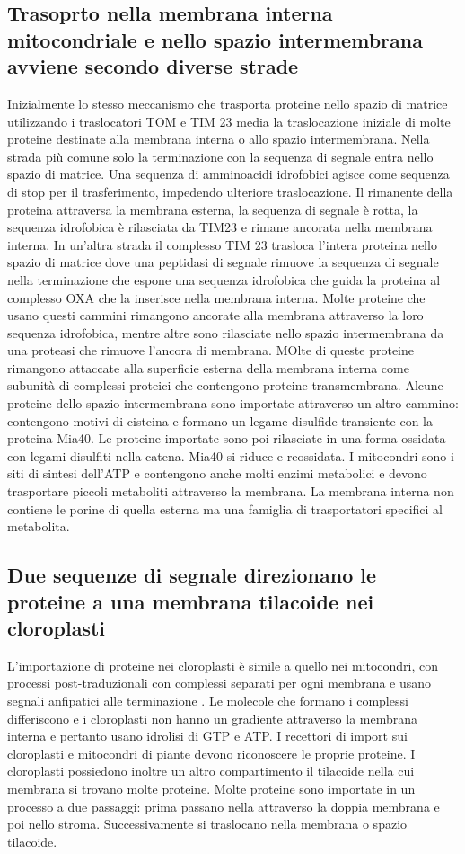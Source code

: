 \subsection{Trasoprto nella membrana interna mitocondriale e nello spazio intermembrana avviene secondo diverse strade}
Inizialmente lo stesso meccanismo che trasporta proteine nello spazio di matrice utilizzando i traslocatori TOM e TIM 23 media la traslocazione iniziale di molte proteine destinate
alla membrana interna o allo spazio intermembrana. Nella strada pi\`u comune solo la terminazione  con la sequenza di segnale entra nello spazio di matrice. Una sequenza di
amminoacidi idrofobici agisce come sequenza di stop per il trasferimento, impedendo ulteriore traslocazione. Il rimanente della proteina attraversa la membrana esterna, la sequenza
di segnale \`e rotta, la sequenza idrofobica \`e rilasciata da TIM23 e rimane ancorata nella membrana interna. In un'altra strada il complesso TIM 23 trasloca l'intera proteina nello
spazio di matrice dove una peptidasi di segnale rimuove la sequenza di segnale nella terminazione  che espone una sequenza idrofobica che guida la proteina al complesso OXA che
la inserisce nella membrana interna. Molte proteine che usano questi cammini rimangono ancorate alla membrana attraverso la loro sequenza idrofobica, mentre altre sono rilasciate 
nello spazio intermembrana da una proteasi che rimuove l'ancora di membrana. MOlte di queste proteine rimangono attaccate alla superficie esterna della membrana interna come subunit\`a
di complessi proteici che contengono proteine transmembrana. Alcune proteine dello spazio intermembrana sono importate attraverso un altro cammino: contengono motivi di cisteina e 
formano un legame disulfide transiente con la proteina Mia40. Le proteine importate sono poi rilasciate in una forma ossidata con legami disulfiti nella catena. Mia40 si riduce e 
reossidata. I mitocondri sono i siti di sintesi dell'ATP e contengono anche molti enzimi metabolici e devono trasportare piccoli metaboliti attraverso la membrana. La membrana interna
non contiene le porine di quella esterna ma una famiglia di trasportatori specifici al metabolita. 
\subsection{Due sequenze di segnale direzionano le proteine a una membrana tilacoide nei cloroplasti}
L'importazione di proteine nei cloroplasti \`e simile a quello nei mitocondri, con processi post-traduzionali con complessi separati per ogni membrana e usano segnali anfipatici alle
terminazione . Le molecole che formano i complessi differiscono e i cloroplasti non hanno un gradiente  attraverso la membrana interna e pertanto usano idrolisi di GTP e
ATP. I recettori di import sui cloroplasti e mitocondri di piante devono riconoscere le proprie proteine. I cloroplasti possiedono inoltre un altro compartimento il tilacoide nella cui
membrana si trovano molte proteine. Molte proteine sono importate in un processo a due passaggi: prima passano nella attraverso la doppia membrana e poi nello stroma. Successivamente
si traslocano nella membrana o spazio tilacoide. 
